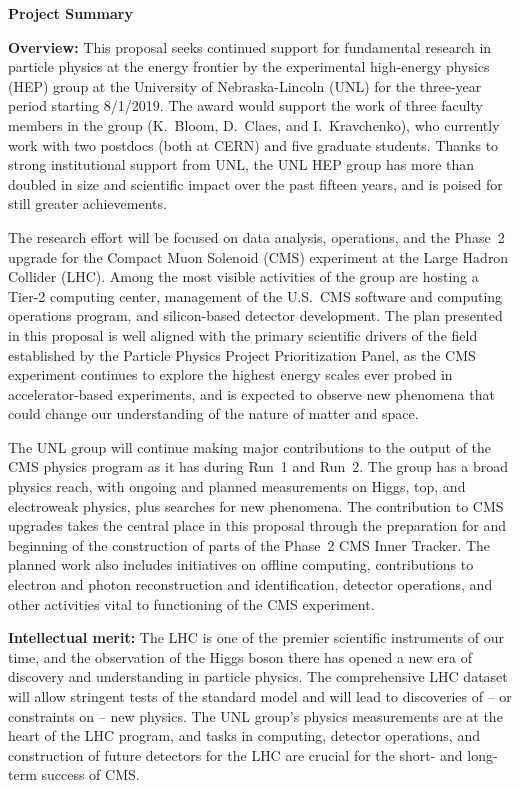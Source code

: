 \documentclass[11pt]{article}
\begin{document}
\begin{center}
{\large \bf Project Summary}\\
\end{center}

{\bf Overview:} This proposal seeks continued support for fundamental research in particle physics at the energy
frontier by the experimental high-energy physics (HEP) group at the University of Nebraska-Lincoln (UNL) for the
three-year period starting 8/1/2019.  The award would support the work of three faculty members in the group (K.~Bloom, D.~Claes, and I.~Kravchenko), who currently work with two postdocs (both at CERN) and five graduate students.  Thanks to strong institutional support from UNL, 
the UNL HEP group has more than doubled in size and scientific impact over the 
past fifteen years, and is poised for still greater achievements.

The research effort will be focused on data analysis, operations, and the Phase~2 upgrade for the Compact Muon Solenoid (CMS) experiment at the Large Hadron Collider (LHC).  Among the most visible activities of the group are hosting a Tier-2 computing center, management of the U.S.~CMS software and computing operations program, and silicon-based detector development. The plan presented in this proposal is well aligned with the primary scientific drivers of the field established by the Particle Physics Project Prioritization Panel, as the CMS experiment continues to explore the highest energy scales ever probed in accelerator-based experiments, and is expected to observe new phenomena that could change our understanding of the nature of matter and space. 

The UNL group will continue making major contributions to the output of the CMS physics program as it has during Run~1 and Run~2. The group has a broad physics reach, with ongoing and planned measurements on Higgs, top, and electroweak physics, plus searches for new phenomena. The contribution to CMS upgrades takes the central place in this proposal through the preparation for and beginning of the construction of parts of the Phase~2 CMS Inner Tracker. The planned work also includes initiatives on offline computing, contributions to electron and photon reconstruction and identification, detector operations, and other activities vital to functioning of the CMS experiment.

{\bf Intellectual merit:} The LHC is one of the premier scientific
instruments of our time, and the observation of the Higgs boson
there has opened a new era of discovery and understanding in
particle physics. The comprehensive LHC dataset 
will allow stringent tests of the standard model and will
lead to discoveries of -- or constraints on -- new physics.
The UNL group's physics measurements are at the heart of the LHC
program, and tasks in computing, detector operations, and
construction of future detectors for the LHC are crucial for the
short- and long-term success of CMS.
\end{document}
